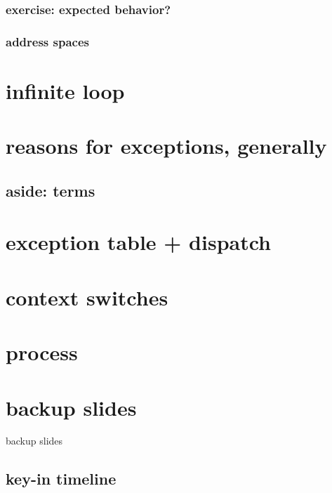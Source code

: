 \subsubsection{exercise: expected behavior?}


\subsubsection{address spaces}


\section{infinite loop}






\section{reasons for exceptions, generally}




\subsection{aside: terms}


\section{exception table + dispatch}



\section{context switches} %


\section{process}


\section{backup slides}
\begin{frame}{backup slides}
\end{frame}

\subsection{key-in timeline}



